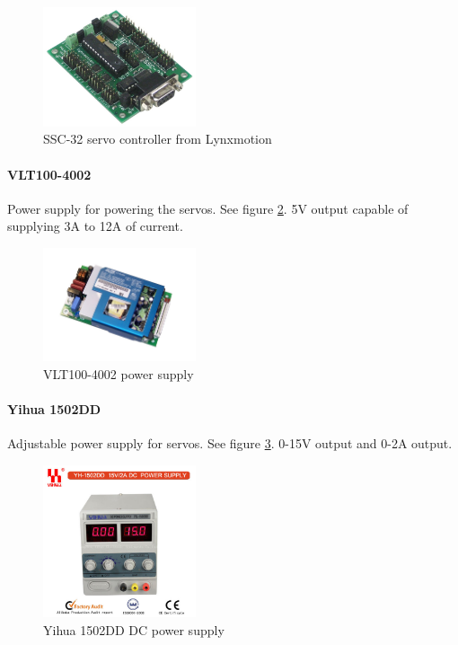 \documentclass[titlepage,letterpaper,12pt]{article}
\begin{document}
\begin{figure}
  \centering
    \includegraphics[width=0.4\textwidth]{figures/lynxmotion-ssc-32-servo-controller-large.jpg}
  \caption{SSC-32 servo controller from Lynxmotion\protect\cite{sscfigcite}}
  \label{sscfig}
\end{figure}

\paragraph{VLT100-4002}Power supply for powering the servos. See figure
\ref{vltfig}. 5V output capable of supplying 3A to 12A of current\cite{vltdata}.

\begin{figure}
  \centering
    \includegraphics[width=0.4\textwidth]{figures/VLT100-4002.jpg}
  \caption{VLT100-4002 power supply\protect\cite{vltfigcite}}
  \label{vltfig}
\end{figure}

\paragraph{Yihua 1502DD}Adjustable power supply for servos. See figure
\ref{yihuafig}. 0-15V output and 0-2A output\cite{yihuadata}. 

\begin{figure}
  \centering
    \includegraphics[width=0.4\textwidth]{figures/Power_Supply_YIHUA_1502DD.jpg}
  \caption{Yihua 1502DD DC power supply\protect\cite{yihuafigcite}}
  \label{yihuafig}
\end{figure}
\end{document}
